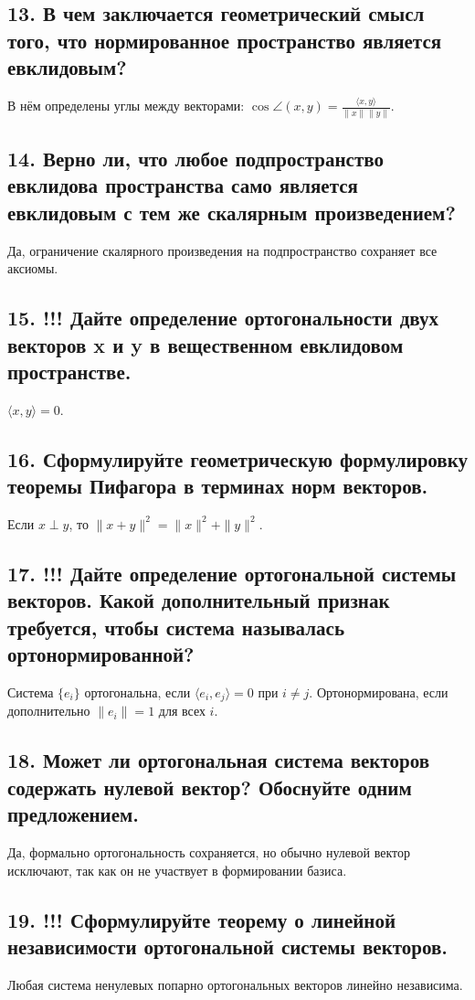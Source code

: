 \documentclass[a4paper,12pt]{article}
\begin{document}
\subsection*{13. В чем заключается геометрический смысл того, что нормированное пространство является евклидовым?}
В нём определены углы между векторами: \(\cos \angle(x,y) = \frac{\langle x,y \rangle}{\|x\|\|y\|}\).

\subsection*{14. Верно ли, что любое подпространство евклидова пространства само является евклидовым с тем же скалярным произведением?}
Да, ограничение скалярного произведения на подпространство сохраняет все аксиомы.

\subsection*{15. !!! Дайте определение ортогональности двух векторов x и y в вещественном евклидовом пространстве.}
\(\langle x, y \rangle = 0\).

\subsection*{16. Сформулируйте геометрическую формулировку теоремы Пифагора в терминах норм векторов.}
Если \(x \perp y\), то \(\|x+y\|^2 = \|x\|^2 + \|y\|^2\).

\subsection*{17. !!! Дайте определение ортогональной системы векторов. Какой дополнительный признак требуется, чтобы система называлась ортонормированной?}
Система \(\{e_i\}\) ортогональна, если \(\langle e_i, e_j \rangle = 0\) при \(i \ne j\). Ортонормирована, если дополнительно \(\|e_i\| = 1\) для всех \(i\).

\subsection*{18. Может ли ортогональная система векторов содержать нулевой вектор? Обоснуйте одним предложением.}
Да, формально ортогональность сохраняется, но обычно нулевой вектор исключают, так как он не участвует в формировании базиса.

\subsection*{19. !!! Сформулируйте теорему о линейной независимости ортогональной системы векторов.}
Любая система ненулевых попарно ортогональных векторов линейно независима.
\end{document}
